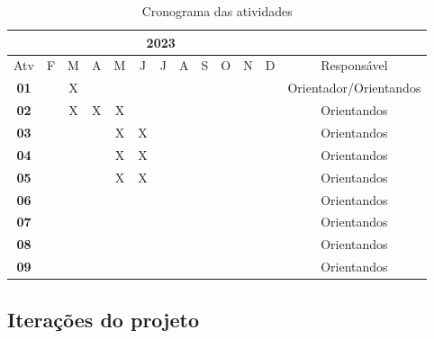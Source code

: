 \begin{table*}[ht]
\centering
\caption{Cronograma das atividades}
\label{tab:cronograma}
\begin{tabular}{|c|c|c|c|c|c|c|c|c|c|c|c|c|}
\hline & \multicolumn{11}{|c|}{2023} & \multicolumn{1}{|c|}{} \\
\hline \multicolumn{1}{|c|}{Atv} & F & M & A & M & J & J & A & S & O & N & D & {Responsável} \\
\hline \textbf{01} & & X& & & & & & & & & & Orientador/Orientandos \\
\hline \textbf{02} & & X& X& X& & & & & & & & Orientandos \\
\hline \textbf{03} & & & & X& X& & & & & & & Orientandos\\
\hline \textbf{04} & & & & X& X& & & & & & & Orientandos\\
\hline \textbf{05} & & & & X& X& & & & & & & Orientandos\\
\hline \textbf{06} & & & & & & & & & & & & Orientandos\\
\hline \textbf{07} & & & & & & & & & & & & Orientandos\\
\hline \textbf{08} & & & & & & & & & & & & Orientandos\\
\hline \textbf{09} & & & & & & & & & & & & Orientandos\\
\hline
\end{tabular} 
\end{table*}

\subsection{Iterações do projeto}

